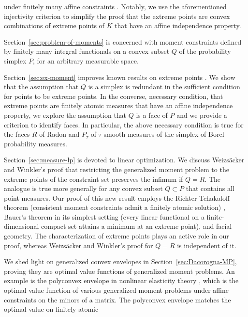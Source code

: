 \documentclass[a4paper,11pt,reqno]{amsart}
\numberwithin{equation}{section}
\theoremstyle{plain}
\theoremstyle{definition}
\begin{document}
under finitely many affine constraints \cite{weizsaecker-winkler80,winkler88}. Notably, 
we use the aforementioned injectivity criterion to simplify the proof that the extreme 
points are convex combinations of extreme points of $K$ that have an affine 
independence property.
\par
%
Section~\ref{sec:problem-of-moments} is concerned with moment constraints defined by
finitely many integral functionals on a convex subset $Q$ of the probability simplex $P$, 
for an arbitrary measurable space.
\par
%
Section~\ref{sec:ex-moment} improves known results on extreme points 
\cite{weizsaecker-winkler80,winkler88}. We show that the assumption that $Q$ is a simplex 
is redundant in the sufficient condition for points to be extreme points. In the converse,
necessary condition, that extreme points are finitely atomic measures that have an affine
independence property, we explore the assumption that $Q$ is a face of $P$ and we provide 
a criterion to identify faces. In particular, the above necessary condition is true for 
the faces $R$ of Radon and $P_\tau$ of $\tau$-smooth measures of the simplex of Borel 
probability measures. 
\par
%
Section~\ref{sec:measure-lp} is devoted to linear optimization. We discuss Weizs\"acker 
and Winkler's proof that restricting the generalized moment problem to the extreme points 
of the constraint set preserves the infimum if $Q=R$. The analogue is true more generally 
for any convex subset $Q\subset P$ that contains all point measures. Our proof of this 
new result employs the Richter-Tchakaloff theorem (consistent moment constraints admit a 
finitely atomic solution) \cite{schmuedgen17,shapiro01}, Bauer's theorem \cite{bauer58} 
in its simplest setting (every linear functional on a finite-dimensional compact set 
attains a minimum at an extreme point), and facial geometry. The characterization of 
extreme points plays an active role in our proof, whereas Weizs\"{a}cker and Winkler's 
proof for $Q=R$ is independent of it.
\par
%
We shed light on generalized convex envelopes in Section~\ref{sec:Dacorogna-MP}, 
proving they are optimal value functions of generalized moment problems. An 
example is the polyconvex envelope in nonlinear elasticity theory 
\cite{ball76,ciarlet21,kruzik-roubicek19}, which is the optimal value function of 
various generalized moment problems under affine constraints on the minors of a 
matrix. The polyconvex envelope matches the optimal value on finitely atomic 
\end{document}
